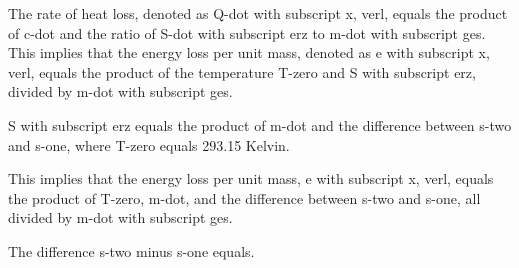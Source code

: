 The rate of heat loss, denoted as Q-dot with subscript x, verl, equals the product of c-dot and the ratio of S-dot with subscript erz to m-dot with subscript ges. This implies that the energy loss per unit mass, denoted as e with subscript x, verl, equals the product of the temperature T-zero and S with subscript erz, divided by m-dot with subscript ges.

S with subscript erz equals the product of m-dot and the difference between s-two and s-one, where T-zero equals 293.15 Kelvin.

This implies that the energy loss per unit mass, e with subscript x, verl, equals the product of T-zero, m-dot, and the difference between s-two and s-one, all divided by m-dot with subscript ges.

The difference s-two minus s-one equals.